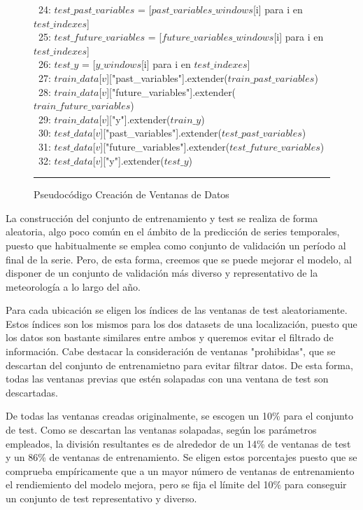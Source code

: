 \begin{figure}[H]
{\begin{center}
\begin{tabbing}
\ 24: \> \> \> $test\_past\_variables$ = [$past\_variables\_windows$[i] para i en $test\_indexes$] \\
\ 25: \> \> \> $test\_future\_variables$ = [$future\_variables\_windows$[i] para i en $test\_indexes$] \\
\ 26: \> \> \> $test\_y$ = [$y\_windows$[i] para i en $test\_indexes$] \\
      
\ 27: \> \> \> $train\_data$[$v$]["past\_variables"].extender($train\_past\_variables$) \\
\ 28: \> \> \> $train\_data$[$v$]["future\_variables"].extender($train\_future\_variables$) \\
\ 29: \> \> \> $train\_data$[$v$][\string"y"].extender($train\_y$) \\
        
\ 30: \> \> \> $test\_data$[$v$]["past\_variables"].extender($test\_past\_variables$) \\
\ 31: \> \> \> $test\_data$[$v$]["future\_variables"].extender($test\_future\_variables$) \\
\ 32: \> \> \> $test\_data$[$v$][\string"y"].extender($test\_y$) \\

\end{tabbing}
\end{center}
\hrule
}
\caption{Pseudocódigo Creación de Ventanas de Datos}
\label{branch_and_bound_max_diversity}
\end{figure}

La construcción del conjunto de entrenamiento y test se realiza de forma aleatoria, algo poco común en el ámbito de la predicción de series temporales, puesto que habitualmente 
se emplea como conjunto de validación un período al final de la serie. Pero, de esta forma, creemos que se puede mejorar el modelo, al disponer de un conjunto de validación
más diverso y representativo de la meteorología a lo largo del año.

Para cada ubicación se eligen los índices de las ventanas de test aleatoriamente. Estos índices son los mismos para los dos datasets de una localización, 
puesto que los datos son bastante similares entre ambos y queremos evitar el filtrado de información. 
Cabe destacar la consideración de ventanas "prohibidas", que se descartan del conjunto de entrenamietno para evitar filtrar datos.
De esta forma, todas las ventanas previas que estén solapadas con una ventana de test son descartadas.

De todas las ventanas creadas originalmente, se escogen un 10\% para el conjunto de test. Como se descartan las ventanas solapadas, según los parámetros empleados, la división resultantes
es de alrededor de un 14\% de ventanas de test y un 86\% de ventanas de entrenamiento. Se eligen estos porcentajes puesto que se comprueba empíricamente que a un mayor número de 
ventanas de entrenamiento el rendiemiento del modelo mejora, pero se fija el límite del 10\% para conseguir un conjunto de test representativo y diverso. 

